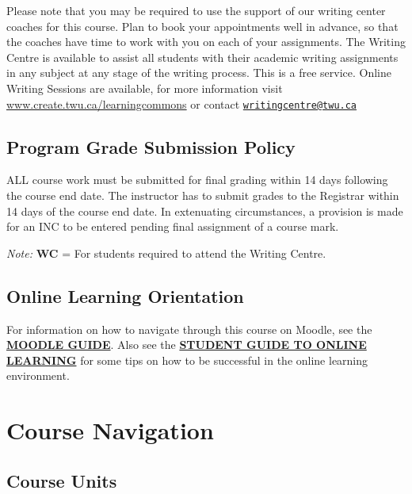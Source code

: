 \documentclass[
]{book}
\begin{document}
Please note that you may be required to use the support of our writing center coaches for this course. Plan to book your appointments well in advance, so that the coaches have time to work with you on each of your assignments. The Writing Centre is available to assist all students with their academic writing assignments in any subject at any stage of the writing process. This is a free service. Online Writing Sessions are available, for more information visit \href{http://www.create.twu.ca/learningcommons}{www.create.twu.ca/learningcommons} or contact \href{mailto:writingcentre@twu.ca}{\nolinkurl{writingcentre@twu.ca}}

\hypertarget{program-grade-submission-policy}{%
\subsection{Program Grade Submission Policy}\label{program-grade-submission-policy}}

ALL course work must be submitted for final grading within 14 days following the course end date. The instructor has to submit grades to the Registrar within 14 days of the course end date. In extenuating circumstances, a provision is made for an INC to be entered pending final assignment of a course mark.

\begin{caution}
\emph{Note:} \textbf{WC} = For students required to attend the Writing
Centre.
\end{caution}

\hypertarget{online-learning-orientation}{%
\subsection{Online Learning Orientation}\label{online-learning-orientation}}

For information on how to navigate through this course on Moodle, see the \href{http://create.twu.ca/help/moodle}{\textbf{MOODLE GUIDE}}. Also see the \href{https://www.twu.ca/online-learning}{\textbf{STUDENT GUIDE TO ONLINE LEARNING}} for some tips on how to be successful in the online learning environment.

\hypertarget{course-navigation-1}{%
\section*{Course Navigation}\label{course-navigation-1}}

\hypertarget{course-units}{%
\subsection*{Course Units}\label{course-units}}
\end{document}
